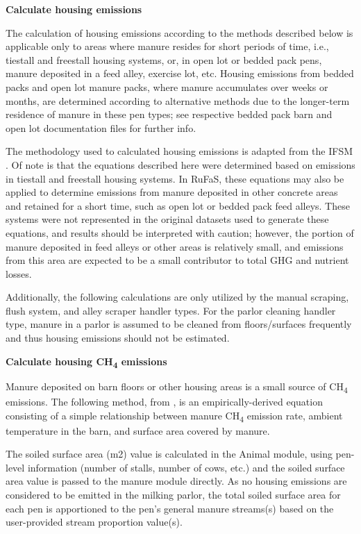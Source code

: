 \begin{refsection}
\textbf{Calculate housing emissions}
\vspace{ 0.25cm}

The calculation of housing emissions according to the methods described below is applicable only to areas where manure resides for short periods of time, i.e., tiestall and freestall housing systems, or, in open lot or bedded pack pens, manure deposited in a feed alley, exercise lot, etc. Housing emissions from bedded packs and open lot manure packs, where manure accumulates over weeks or months, are determined according to alternative methods due to the longer-term residence of manure in these pen types; see respective bedded pack barn and open lot documentation files for further info. 

\vspace{ 0.25cm}
The methodology used to calculated housing emissions is adapted from the IFSM \parencite{Rotz2023}. Of note is that the equations described here were determined based on emissions in tiestall and freestall housing systems. In RuFaS, these equations may also be applied to determine emissions from manure deposited in other concrete areas and retained for a short time, such as open lot or bedded pack feed alleys. These systems were not represented in the original datasets used to generate these equations, and results should be interpreted with caution; however, the portion of manure deposited in feed alleys or other areas is relatively small, and emissions from this area are expected to be a small contributor to total GHG and nutrient losses.

\vspace{ 0.25cm}
Additionally, the following calculations are only utilized by the manual scraping, flush system, and alley scraper handler types. For the parlor cleaning handler type, manure in a parlor is assumed to be cleaned from floors/surfaces frequently and thus housing emissions should not be estimated. 

\vspace{ 0.25cm}
\textbf{Calculate housing CH\textsubscript{4} emissions}
\vspace{ 0.25cm}

Manure deposited on barn floors or other housing areas is a small source of CH\textsubscript{4} emissions. The following method, from \cite{Chianese2009a}, is an empirically-derived equation consisting of a simple relationship between manure CH\textsubscript{4} emission rate, ambient temperature in the barn, and surface area covered by manure. 
\begin{tcolorbox}[colback=white, colframe=black, boxrule=0.5pt, arc=3pt, width=\textwidth]
The soiled surface area (m2) value is calculated in the Animal module, using pen-level information (number of stalls, number of cows, etc.) and the soiled surface area value is passed to the manure module directly. As no housing emissions are considered to be emitted in the milking parlor, the total soiled surface area for each pen is apportioned to the pen's general manure streams(s) based on the user-provided stream proportion value(s).
\end{tcolorbox}



\end{refsection}
